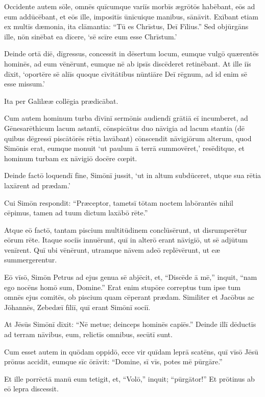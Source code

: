 \Versus Occidente autem sōle, omnēs quīcumque variīs morbīs ægrōtōs habēbant, eōs ad eum addūcēbant, et eōs ille, impositīs ūnīcuique manibus, sānāvit.
\Versus Exībant etiam ex multīs dæmonia, ita clāmantia: ``Tū es Chrīstus, Deī Fīlius.'' Sed objūrgāns ille, nōn sinēbat ea dīcere, `sē scīre eum esse Chrīstum.'

\Versus Deinde ortā diē, dīgressus, concessit in dēsertum locum, eumque vulgō quærentēs hominēs, ad eum vēnērunt, eumque nē ab ipsīs discēderet retinēbant.
\Versus At ille iīs dīxit, `oportēre sē aliīs quoque cīvitātibus nūntiāre Deī rēgnum, ad id enim sē esse missum.'

\Versus Ita per Galilææ collēgia prædicābat.



\Caput
\Versus Cum autem hominum turba dīvīnī sermōnis audiendī grātiā eī incumberet, ad Gēnesarēthicum lacum astantī,
\Versus cōnspicātus duo nāvigia ad lacum stantia (dē quibus dēgressī piscātōrēs rētia lavābant) cōnscendit nāvigiōrum alterum, quod Simōnis erat,
\Versus eumque monuit `ut paulum ā terrā summovēret,' resēditque, et hominum turbam ex nāvigiō docēre cœpit.

\Versus Deinde factō loquendī fīne, Simōnī jussit, `ut in altum subdūceret, utque sua rētia laxārent ad prædam.'

\Versus Cui Simōn respondit: ``Præceptor, tametsī tōtam noctem labōrantēs nihil cēpimus, tamen ad tuum dictum laxābō rēte.''

\Versus Atque eō factō, tantam piscium multitūdinem conclūsērunt, ut disrumperētur eōrum rēte.
\Versus Itaque sociīs innuērunt, quī in alterō erant nāvigiō, ut sē adjūtum venīrent. Quī ubi vēnērunt, utramque nāvem adeō replēvērunt, ut eæ summergerentur.

\Versus Eō vīsō, Simōn Petrus ad ejus genua sē abjēcit, et, ``Discēde ā mē,'' inquit, ``nam ego nocēns homō sum, Domine.''
\Versus Erat enim stupōre correptus tum ipse tum omnēs ejus comitēs, ob piscium quam cēperant prædam.
\Versus Similiter et Jacōbus ac Jōhannēs, Zebedæī fīliī, quī erant Simōnī sociī.

 At Jēsūs Simōnī dīxit: ``Nē metue; deinceps hominēs capiēs.''
\Versus Deinde illī dēductīs ad terram nāvibus, eum, relictīs omnibus, secūtī sunt.

\Versus Cum esset autem in quōdam oppidō, ecce vir quīdam leprā scatēns, quī vīsō Jēsū prōnus accidit, eumque sīc ōrāvit: ``Domine, sī vīs, potes mē pūrgāre.''

\Versus Et ille porrēctā manū eum tetigit, et, ``Volō,'' inquit; ``pūrgātor!'' Et prōtinus ab eō lepra discessit.

